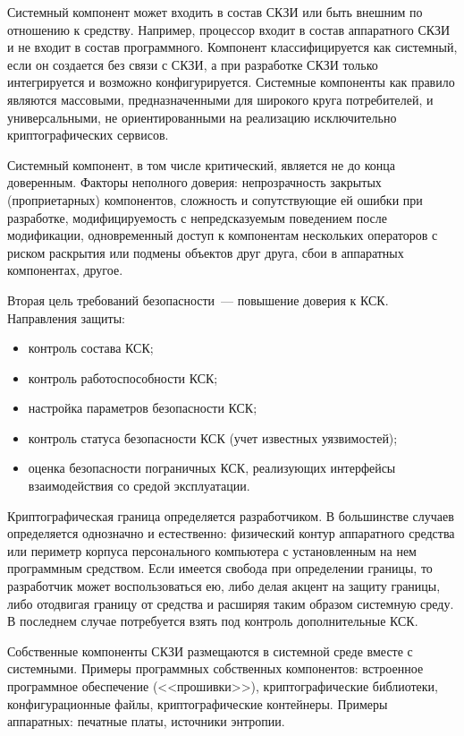 Системный компонент может входить в состав СКЗИ или быть внешним по отношению
к средству. Например, процессор входит в состав аппаратного СКЗИ и не входит в 
состав программного. 
%
Компонент классифицируется как системный, если он создается без связи с 
СКЗИ, а при разработке СКЗИ только интегрируется и возможно конфигурируется.
%
Системные компоненты как правило являются массовыми, предназначенными для 
широкого круга потребителей, и универсальными, не ориентированными на 
реализацию исключительно криптографических сервисов.

Системный компонент, в том числе критический, является не до конца доверенным. 
% 
Факторы неполного доверия:
%
непрозрачность закрытых (проприетарных) компонентов,
%
сложность и сопутствующие ей ошибки при разработке,
%
модифицируемость с непредсказуемым поведением после модификации,
%
одновременный доступ к компонентам нескольких операторов с риском раскрытия или 
подмены объектов друг друга,
%
сбои в аппаратных компонентах,
%
другое.

Вторая цель требований безопасности~--- повышение доверия к КСК. 
Направления защиты:
\begin{itemize}
\item
контроль состава КСК;
\item
контроль работоспособности КСК;
\item
настройка параметров безопасности КСК;
\item
контроль статуса безопасности КСК (учет известных уязвимостей);
\item
оценка безопасности пограничных КСК, реализующих интерфейсы взаимодействия со 
средой эксплуатации.
\end{itemize}

Криптографическая граница определяется разработчиком.
В большинстве случаев определяется однозначно и естественно:  
физический контур аппаратного средства или периметр корпуса персонального 
компьютера с установленным на нем программным средством.
%
Если имеется свобода при определении границы, то разработчик может
воспользоваться ею, либо делая акцент на защиту границы, либо отодвигая границу
от средства и расширяя таким образом системную среду. В последнем случае
потребуется взять под контроль дополнительные КСК.

Собственные компоненты СКЗИ размещаются в системной среде вместе с системными.
Примеры программных собственных компонентов: 
встроенное программное обеспечение (<<прошивки>>),
криптографические библиотеки, конфигурационные файлы, криптографические 
контейнеры.
%
Примеры аппаратных: печатные платы, источники энтропии.

